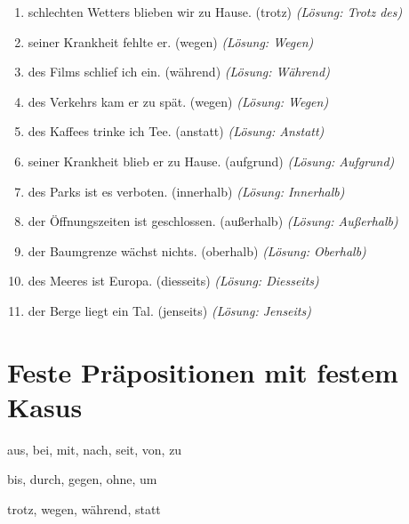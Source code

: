 \begin{enumerate}
    \item \underline{\hspace{1cm}} schlechten Wetters blieben wir zu Hause. (trotz) \quad \textit{(Lösung: Trotz des)}
    \item \underline{\hspace{1cm}} seiner Krankheit fehlte er. (wegen) \quad \textit{(Lösung: Wegen)}
    \item \underline{\hspace{1cm}} des Films schlief ich ein. (während) \quad \textit{(Lösung: Während)}
    \item \underline{\hspace{1cm}} des Verkehrs kam er zu spät. (wegen) \quad \textit{(Lösung: Wegen)}
    \item \underline{\hspace{1cm}} des Kaffees trinke ich Tee. (anstatt) \quad \textit{(Lösung: Anstatt)}
    \item \underline{\hspace{1cm}} seiner Krankheit blieb er zu Hause. (aufgrund) \quad \textit{(Lösung: Aufgrund)}
    \item \underline{\hspace{1cm}} des Parks ist es verboten. (innerhalb) \quad \textit{(Lösung: Innerhalb)}
    \item \underline{\hspace{1cm}} der Öffnungszeiten ist geschlossen. (außerhalb) \quad \textit{(Lösung: Außerhalb)}
    \item \underline{\hspace{1cm}} der Baumgrenze wächst nichts. (oberhalb) \quad \textit{(Lösung: Oberhalb)}
    \item \underline{\hspace{1cm}} des Meeres ist Europa. (diesseits) \quad \textit{(Lösung: Diesseits)}
    \item \underline{\hspace{1cm}} der Berge liegt ein Tal. (jenseits) \quad \textit{(Lösung: Jenseits)}
\end{enumerate}

\section{Feste Präpositionen mit festem Kasus}
\label{sec:FestePraep}

\begin{tcolorbox}[title={Präposition: Dativ}]
aus, bei, mit, nach, seit, von, zu
\end{tcolorbox}

\begin{tcolorbox}[title={Präposition: Akkusativ}]
bis, durch, gegen, ohne, um
\end{tcolorbox}

\begin{tcolorbox}[title={Präposition: Genitiv}]
trotz, wegen, während, statt
\end{tcolorbox}

\chapterend